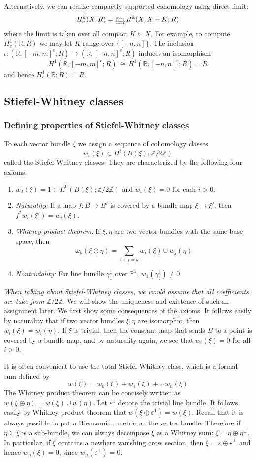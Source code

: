 \documentclass[12pt]{article}
\theoremstyle{plain}
\theoremstyle{definition}
\newcommand{\IP}{\mathbb{P}}
\newcommand{\IR}{\mathbb{R}}
\newcommand{\IZ}{\mathbb{Z}}
\newcommand\iso{\,{\cong}\,}
\newcommand{\<}{\langle}
\renewcommand{\>}{\rangle}
\newcommand{\w}{\omega}
\newcommand{\sm}{\varepsilon}
\begin{document}
Alternatively, we can realize compactly supported cohomology using direct limit:
$$ H^k_c(X; R) = \varinjlim H^k(X, X - K; R) $$
where the limit is taken over all compact $K \subseteq X$. For example, to compute $H^1_c(\IR; R)$ we may let $K$ range over $\{[-n, n]\}$. The inclusion $\iota : (\IR, [-m, m]^c;R) \to (\IR, [-n, n]^c; R)$ induces an isomorphism $$H^1(\IR, [-m, m]^c; R) \iso H^1(\IR, [-n, n]^c; R) = R$$ and hence $H^1_c(\IR; R) = R$. 


\subsection{Stiefel-Whitney classes}
\subsubsection{Defining properties of Stiefel-Whitney classes}
To each vector bundle $\xi$ we assign a sequence of cohomology classes 
$$ w_i(\xi) \in H^i(B(\xi); \IZ/2\IZ)$$
called the Stiefel-Whitney classes. They are characterized by the following four axioms:
\begin{enumerate}
\item $w_0(\xi) = 1 \in H^0(B(\xi); \IZ/2\IZ)$ and $w_i(\xi) = 0$ for each $i > 0$.
\item \textit{Naturality: }If a map $f : B \to B'$ is covered by a bundle map $\xi \to \xi'$, then $f^* w_i(\xi') = w_i(\xi)$. 
\item \textit{Whitney product theorem: } If $\xi, \eta$ are two vector bundles with the same base space, then 
$$ \w_k(\xi \oplus \eta) = \sum_{i + j = k} w_i(\xi) \cup w_j(\eta) $$
\item \textit{Nontriviality: } For line bundle $\gamma^1_1$ over $\IP^1$, $w_1(\gamma^1_1) \neq 0$. 
\end{enumerate}
\textit{When talking about Stiefel-Whitney classes, we would assume that all coefficients are take from $\IZ/2\IZ$. }
We will show the uniqueness and existence of such an assignment later. We first show some consequences of the axioms. It follows easily by naturality that if two vector bundles $\xi, \eta$ are isomorphic, then $w_i(\xi) = w_i(\eta)$. If $\xi$ is trivial, then the constant map that sends $B$ to a point is covered by a bundle map, and by naturality again, we see that 
$w_i (\xi) = 0$ for all $i > 0$. 

It is often convenient to use the total Stiefel-Whitney class, which is a formal sum defined by 
$$ w(\xi) = w_0(\xi) + w_1(\xi) + \cdots w_n(\xi)$$
The Whitney product theorem can be concisely written as $w(\xi \oplus \eta) = w(\xi)  \cup w(\eta)$. Let $\sm^1$ denote the trivial line bundle. It follows easily by Whitney product theorem that $w(\xi \oplus \sm^1) = w(\xi)$. Recall that it is always possible to put a Riemannian metric on the vector bundle. Therefore if $\eta \subseteq \xi$ is a sub-bundle, we can always decompose $\xi$ as a Whitney sum: $\xi  = \eta \oplus \eta^\perp$. In particular, if $\xi$ contains a nowhere vanishing cross section, then $\xi = \sm \oplus \sm^\perp$ and hence $w_n (\xi ) = 0$, since $w_n(\sm^\perp) = 0$. 
\end{document}
